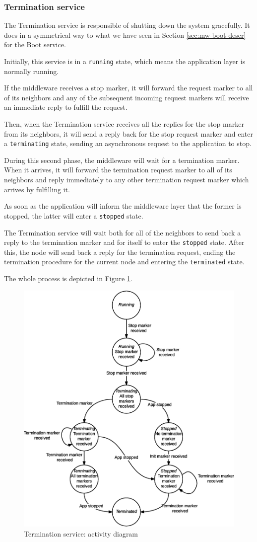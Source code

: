 \subsubsection{Termination service}

The Termination service is responsible of shutting down the system gracefully.
It does in a symmetrical way to what we have seen in Section
\ref{sec:mw-boot-descr} for the Boot service.

Initially, this service is in a \texttt{running} state, which means the
application layer is normally running.

If the middleware receives a stop marker, it will forward the request marker to
all of its neighbors and any of the subsequent incoming request markers will
receive an immediate reply to fulfill the request.

Then, when the Termination service receives all the replies for the stop marker
from its neighbors, it will send a reply back for the stop request marker and
enter a \texttt{terminating} state, sending an asynchronous request to the
application to stop.

During this second phase, the middleware will wait for a termination marker.
When it arrives, it will forward the termination request marker to all of its
neighbors and reply immediately to any other termination request marker which
arrives by fulfilling it.

As soon as the application will inform the middleware layer that the former is
stopped, the latter will enter a \texttt{stopped} state.

The Termination service will wait both for all of the neighbors to send back a
reply to the termination marker and for itself to enter the \texttt{stopped}
state.
After this, the node will send back a reply for the termination request, ending
the termination procedure for the current node and entering the
\texttt{terminated} state.

The whole process is depicted in Figure \ref{fig:mw-termination}.

\begin{figure}[H]
  \centering
  \includegraphics[width=.8\columnwidth]{images/solution/mw/termination.eps}
  \caption{Termination service: activity diagram}
  \label{fig:mw-termination}
\end{figure}
